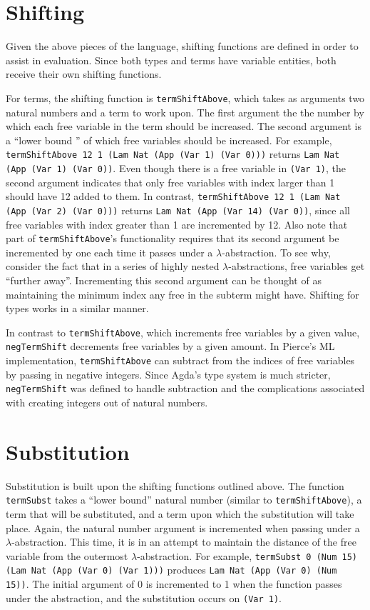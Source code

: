 \documentclass{amsart}
\begin{document}
\section{Shifting}
Given the above pieces of the language, shifting functions are defined in
order to assist in evaluation.  Since both types and terms have variable
entities, both receive their own shifting functions.

For terms, the shifting function is \texttt{termShiftAbove}, which takes as
arguments two natural numbers and a term to work upon.  The first argument the
the number by which each free variable in the term should be increased.  The
second argument is a ``lower bound '' of which free variables should be
increased.  For example, \texttt{termShiftAbove 12 1 (Lam Nat (App (Var 1)
(Var 0)))} returns \texttt{Lam Nat (App (Var 1) (Var 0))}.  Even though there
is a free variable in \texttt{(Var 1)}, the second argument indicates that
only free variables with index larger than 1 should have 12 added to them.  In
contrast, \texttt{termShiftAbove 12 1 (Lam Nat (App (Var 2) (Var 0)))} returns
\texttt{Lam Nat (App (Var 14) (Var 0))}, since all free variables with index
greater than 1 are incremented by 12.  Also note that part of
\texttt{termShiftAbove}'s functionality requires that its second argument be
incremented by one each time it passes under a $\lambda$-abstraction.  To see
why, consider the fact that in a series of highly nested
$\lambda$-abstractions, free variables get ``further away''.  Incrementing
this second argument can be thought of as maintaining the minimum index any
free in the subterm might have.  Shifting for types works in a similar manner.

In contrast to \texttt{termShiftAbove}, which increments free variables by
a given value, \texttt{negTermShift} decrements free variables by a given
amount.  In Pierce's ML implementation, \texttt{termShiftAbove} can subtract
from the indices of free variables by passing in negative integers.  Since
Agda's type system is much stricter, \texttt{negTermShift} was defined to
handle subtraction and the complications associated with creating integers out
of natural numbers.

\section{Substitution}
Substitution is built upon the shifting functions outlined above.  The
function \texttt{termSubst} takes a ``lower bound'' natural number (similar to
\texttt{termShiftAbove}), a term that will be substituted, and a term upon
which the substitution will take place.  Again, the natural number argument is
incremented when passing under a $\lambda$-abstraction.  This time, it is in
an attempt to maintain the distance of the free variable from the outermost
$\lambda$-abstraction.  For example, \texttt{termSubst 0 (Num 15) (Lam Nat
(App (Var 0) (Var 1)))} produces \texttt{Lam Nat (App (Var 0) (Num 15))}.  The
initial argument of 0 is incremented to 1 when the function passes under the
abstraction, and the substitution occurs on \texttt{(Var 1)}.
\end{document}
